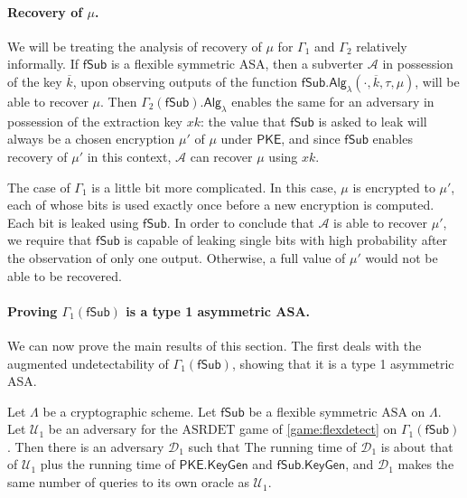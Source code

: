 \paragraph{Recovery of $\mu$.} We will be treating the analysis of recovery of $\mu$ for $\Gamma_1$ and $\Gamma_2$ relatively informally. If $\mathsf{fSub}$ is a flexible symmetric ASA, then a subverter $\mathcal{A}$ in possession of the key $\overline{k}$, upon observing outputs of the function $\mathsf{fSub.Alg}_\lambda(\cdot,\overline{k},\tau,\mu)$, will be able to recover $\mu$. Then $\Gamma_2(\mathsf{fSub})\mathsf{.Alg}_\lambda$ enables the same for an adversary in possession of the extraction key $xk$: the value that $\mathsf{fSub}$ is asked to leak will always be a chosen encryption $\mu'$ of $\mu$ under $\mathsf{PKE}$, and since $\mathsf{fSub}$ enables recovery of $\mu'$ in this context, $\mathcal{A}$ can recover $\mu$ using $xk$.

The case of $\Gamma_1$ is a little bit more complicated. In this case, $\mu$ is encrypted to $\mu'$, each of whose bits is used exactly once before a new encryption is computed. Each bit is leaked using $\mathsf{fSub}$. In order to conclude that $\mathcal{A}$ is able to recover $\mu'$, we require that $\mathsf{fSub}$ is capable of leaking single bits with high probability after the observation of only one output. Otherwise, a full value of $\mu'$ would not be able to be recovered.

\paragraph{Proving $\Gamma_1(\mathsf{fSub})$ is a type 1 asymmetric ASA.}
We can now prove the main results of this section. The first deals with the augmented undetectability of $\Gamma_1(\mathsf{fSub})$, showing that it is a type 1 asymmetric ASA.

\begin{theorem} \label{theorem:gen1}
Let $\mathsf{\Lambda}$ be a cryptographic scheme. Let $\mathsf{fSub}$ be a flexible symmetric $\mathrm{ASA}$ on $\mathsf{\Lambda}$. Let $\mathcal{U}_1$ be an adversary for the $\mathrm{ASRDET}$ game of \autoref{game:flexdetect} on $\Gamma_1(\mathsf{fSub})$. Then there is an adversary $\mathcal{D}_1$ such that
The running time of $\mathcal{D}_1$ is about that of $\mathcal{U}_1$ plus the running time of $\mathsf{PKE.KeyGen}$ and $\mathsf{fSub.KeyGen}$, and $\mathcal{D}_1$ makes the same number of queries to its own oracle as $\mathcal{U}_1$.
\end{theorem}

